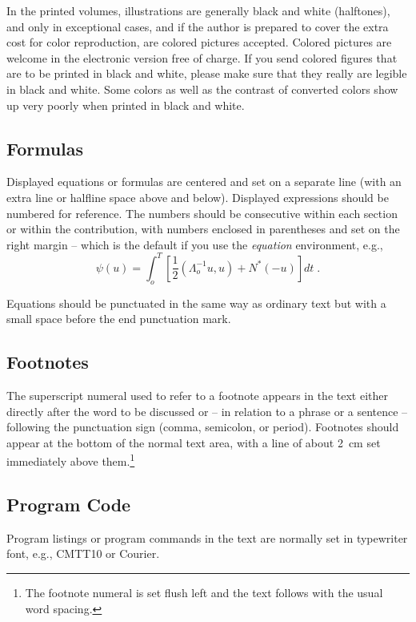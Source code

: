 \documentclass[runningheads,a4paper]{llncs}
\begin{document}
In the printed volumes, illustrations are generally black and white
(halftones), and only in exceptional cases, and if the author is
prepared to cover the extra cost for color reproduction, are colored
pictures accepted. Colored pictures are welcome in the electronic
version free of charge. If you send colored figures that are to be
printed in black and white, please make sure that they really are
legible in black and white. Some colors as well as the contrast of
converted colors show up very poorly when printed in black and white.

\subsection{Formulas}

Displayed equations or formulas are centered and set on a separate
line (with an extra line or halfline space above and below). Displayed
expressions should be numbered for reference. The numbers should be
consecutive within each section or within the contribution,
with numbers enclosed in parentheses and set on the right margin --
which is the default if you use the \emph{equation} environment, e.g.,
\begin{equation}
  \psi (u) = \int_{o}^{T} \left[\frac{1}{2}
  \left(\Lambda_{o}^{-1} u,u\right) + N^{\ast} (-u)\right] dt \;  .
\end{equation}

Equations should be punctuated in the same way as ordinary
text but with a small space before the end punctuation mark.

\subsection{Footnotes}

The superscript numeral used to refer to a footnote appears in the text
either directly after the word to be discussed or -- in relation to a
phrase or a sentence -- following the punctuation sign (comma,
semicolon, or period). Footnotes should appear at the bottom of
the
normal text area, with a line of about 2~cm set
immediately above them.\footnote{The footnote numeral is set flush left
and the text follows with the usual word spacing.}

\subsection{Program Code}

Program listings or program commands in the text are normally set in
typewriter font, e.g., CMTT10 or Courier.
\end{document}
